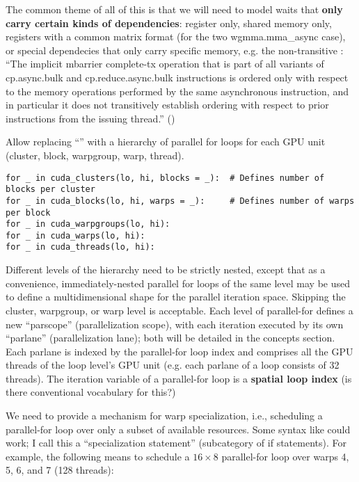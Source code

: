 The common theme of all of this is that we will need to model waits that \textbf{only carry certain kinds of dependencies}: register only, shared memory only, registers with a common matrix format (for the two wgmma.mma\_async case), or special dependecies that only carry specific memory, e.g. the non-transitive \completeTxOperation: ``The implicit mbarrier complete-tx operation that is part of all variants of cp.async.bulk and cp.reduce.async.bulk instructions is ordered only with respect to the memory operations performed by the same asynchronous instruction, and in particular it does not transitively establish ordering with respect to prior instructions from the issuing thread.'' ()

\newpage
{}

 Allow replacing ``'' with a hierarchy of parallel for loops for each GPU unit (cluster, block, warpgroup, warp, thread).

\filbreak
{\color{lightttColor}
\begin{verbatim}
for _ in cuda_clusters(lo, hi, blocks = _):  # Defines number of blocks per cluster
for _ in cuda_blocks(lo, hi, warps = _):     # Defines number of warps per block
for _ in cuda_warpgroups(lo, hi):
for _ in cuda_warps(lo, hi):
for _ in cuda_threads(lo, hi):
\end{verbatim}
}

\filbreak
Different levels of the hierarchy need to be strictly nested, except that as a convenience, immediately-nested parallel for loops of the same level may be used to define a multidimensional shape for the parallel iteration space.
Skipping the cluster, warpgroup, or warp level is acceptable.
Each level of parallel-for defines a new ``parscope'' (parallelization scope), with each iteration executed by its own ``parlane'' (parallelization lane); both will be detailed in the concepts section.
Each parlane is indexed by the parallel-for loop index and comprises all the GPU threads of the loop level's GPU unit (e.g. each parlane of a  loop consists of 32 threads).
The iteration variable of a parallel-for loop is a \textbf{spatial loop index} (is there conventional vocabulary for this?)

\filbreak
{} We need to provide a mechanism for warp specialization, i.e., scheduling a parallel-for loop over only a subset of available resources.
Some syntax like  could work; I call this a ``specialization statement'' (subcategory of if statements).
For example, the following means to schedule a $16 \times 8$ parallel-for loop over warps 4, 5, 6, and 7 (128 threads):

